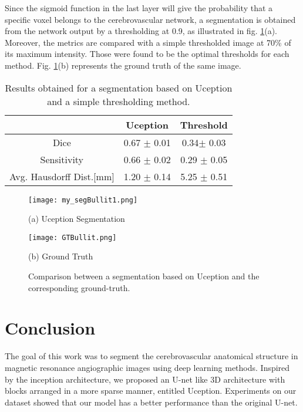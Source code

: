 \documentclass{article}
\begin{document}
Since the sigmoid function in the last layer will give the probability that a specific voxel belongs to the cerebrovascular network, a segmentation is obtained from the network output by a thresholding at 0.9, as illustrated in fig. \ref{fig:resukts_img}(a). Moreover, the metrics are compared with a simple thresholded image at 70\% of its maximum intensity. Those were found to be the optimal thresholds for each method. Fig. \ref{fig:resukts_img}(b) represents the ground truth of the same image.

\begin{table}[ht]
\begin{tabular}{||c||c|c||}
\hline
& Uception & Threshold \\ [0.5ex]
\hline\hline
Dice &   0.67 $\pm$ 0.01 & 0.34$\pm$ 0.03 \\
\hline
Sensitivity & 0.66 $\pm$ 0.02 & 0.29 $\pm$ 0.05 \\[1ex]
 \hline
Avg. Hausdorff Dist.[mm]  & 1.20 $\pm$  0.14 & 5.25 $\pm$  0.51 \\[1ex]
 \hline
\end{tabular}
\caption{Results obtained for a segmentation based on Uception and a simple thresholding method.}
\label{table:results}
\end{table}


\begin{figure}[htb]
\begin{minipage}[b]{.48\linewidth}
  \centering
  \centerline{\texttt{[image: my\_segBullit1.png]}}
  \centerline{(a) Uception Segmentation}\medskip
\end{minipage}
\begin{minipage}[b]{0.48\linewidth}
  \centering
  \centerline{\texttt{[image: GTBullit.png]}}
  \centerline{(b) Ground Truth}\medskip
\end{minipage}
\caption{Comparison between a segmentation based on Uception and the corresponding ground-truth.}
\label{fig:resukts_img}
\end{figure}


\section{Conclusion}

The goal of this work was to segment the cerebrovascular anatomical structure in magnetic resonance angiographic images using deep learning methods. Inspired by the inception architecture, we proposed an U-net like 3D architecture with blocks arranged in a more sparse manner, entitled Uception. Experiments on our dataset showed that our model has a better performance than the original U-net.
\end{document}
